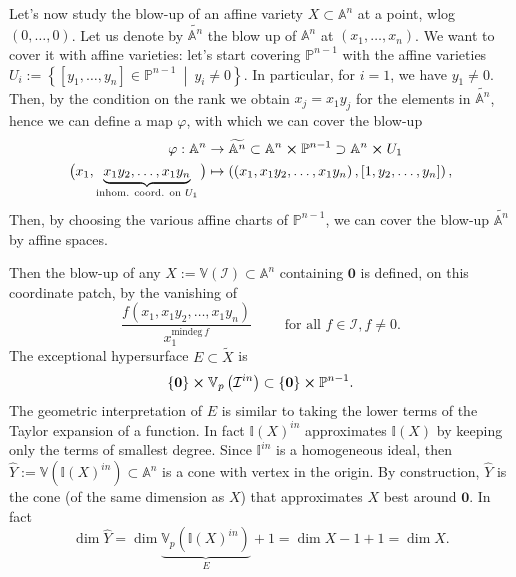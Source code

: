 \begin{rem}[]
	Let's now study the blow-up of an affine variety $X \subset \mathbb{A}^{n}$ at a point,
	wlog $\left( 0, \ldots, 0 \right)$.
	Let us denote by $\widetilde{\mathbb{A}^{n}}$ the blow up of $\mathbb{A}^{n}$
	at $\left( x_1, \ldots, x_n \right)$.
	We want to cover it with affine varieties:
	let's start covering $\mathbb{P}^{n-1}$ with the affine varieties
	$U_i := \left\{ \left[ y_1 , \ldots , y_n \right] \in \mathbb{P}^{n-1} \ \middle|\ y_i \neq 0 \right\}$.
	In particular, for $i = 1$, we have $y_1 \neq 0$.
	Then, by the condition on the rank we obtain $x_j = x_1 y_j$ for the elements in
	$\widetilde{\mathbb{A}^{n}}$, hence we can define a map $\varphi$, with which we can cover the blow-up
	\begin{align}
		\varphi: \mathbb{A}^{n} &\to \widetilde{\mathbb{A}^{n}} \subset \mathbb{A}^{n} \cross \mathbb{P}^{n-1}
		\supset \mathbb{A}^{n} \cross U_1\\
		\big( x_1, \underbrace{x_1y_2, \ldots, x_1y_n}_{\text{inhom. coord. on }U_1} \big) &\mapsto 
		\left(\left( x_1, x_1y_2, \ldots, x_1y_n \right), \left[ 1, y_2 , \ldots , y_n \right]\right)
	,\end{align} 
	Then, by choosing the various affine charts of $\mathbb{P}^{n-1}$, we can cover
	the blow-up $\widetilde{\mathbb{A}^{n}}$ by affine spaces.

	Then the blow-up of any $X := \mathbb{V}\left( \mathcal{I} \right) \subset \mathbb{A}^{n}$ containing $\mathbf{0}$
	is defined, on this coordinate patch, by the vanishing of
	\begin{equation}
		\frac{f(x_1, x_1y_2, \ldots, x_1y_n)}{x_1^{\mathrm{mindeg}\, f}} \qquad
		\text{ for all } f \in \mathcal{I}, f \neq 0
	.\end{equation} 
	The exceptional hypersurface $E \subset \widetilde{X}$ is
	\begin{equation}
	\left\{ \mathbf{0} \right\} \cross \mathbb{V}_p\left( \mathcal{I}^{in} \right)
	\subset \left\{ \mathbf{0} \right\} \cross \mathbb{P}^{n-1}
	.\end{equation} 
	The geometric interpretation of $E$ is similar to taking the lower terms of
	the Taylor expansion of a function.
	In fact $\mathbb{I}(X)^{in}$ approximates $\mathbb{I}(X)$ by keeping only the terms of smallest degree.
	Since $\mathbb{I}^{in}$ is a homogeneous ideal, then
	$\hat{Y} := \mathbb{V}\left( \mathbb{I}(X)^{in} \right) \subset \mathbb{A}^{n}$ is
	a cone with vertex in the origin.
	By construction, $\hat{Y}$ is the cone (of the same dimension as $X$) that approximates $X$ best around $\mathbf{0}$.
	In fact
	\begin{equation}
		\dim \hat{Y} = \dim \underbrace{\mathbb{V}_p\left( \mathbb{I}(X)^{in} \right)}_{E} + 1 =
		\dim X - 1 + 1 = \dim X
	.\end{equation} 
\end{rem}

